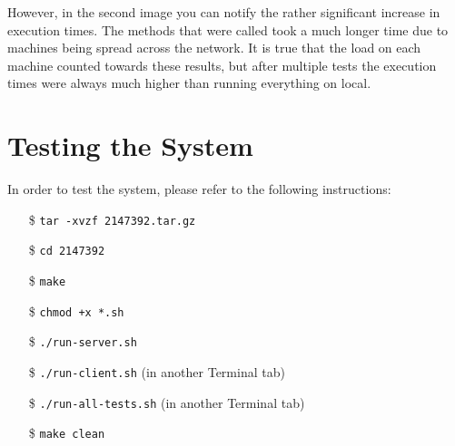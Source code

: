 \documentclass[11pt]{article}
\begin{document}
	\vspace{0.25cm}
	
	However, in the second image you can notify the rather significant increase in execution times. The methods that were called took a much longer time due to machines being spread across the network. It is true that the load on each machine counted towards these results, but after multiple tests the execution times were always much higher than running everything on local.
	
\pagebreak

\section*{Testing the System}
 In order to test the system, please refer to the following instructions:
 \begin{itemize}
     \item[\$] \texttt{tar -xvzf 2147392.tar.gz}
     \item[\$] \texttt{cd 2147392}
     \item[\$] \texttt{make}
     \item[\$] \texttt{chmod +x *.sh}
     \item[\$] \texttt{./run-server.sh}
     \item[\$] \texttt{./run-client.sh} (in another Terminal tab)
     \item[\$] \texttt{./run-all-tests.sh} (in another Terminal tab)
     \item[\$] \texttt{make clean}     
 \end{itemize}
\end{document}
